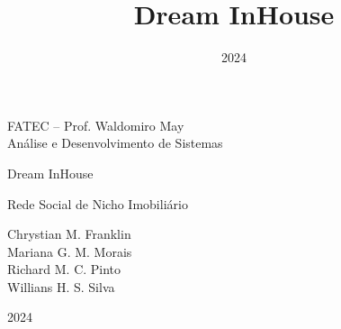 \documentclass[a4paper,12pt]{article}
\title{{\Huge Dream InHouse}}
\author{
}
\date{2024}
\begin{document}
\begin{titlingpage}
    \begin{center}
        \large
            {\Huge
                FATEC -- Prof. Waldomiro May
            }\\
            Análise e Desenvolvimento de Sistemas

            \vspace{3cm}

            \vspace{1cm}
            {\Huge
                Dream InHouse
            }

            Rede Social de Nicho Imobiliário

            \vspace{5cm}
            {
                Chrystian M. Franklin\\
                Mariana G. M. Morais\\
                Richard M. C. Pinto\\
                Willians H. S. Silva
            }

            \vspace{2cm}
            2024
        \normalsize
    \end{center}
\end{titlingpage}
\end{document}
